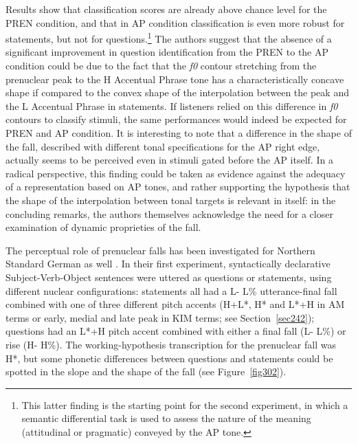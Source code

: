 Results show that classification scores are already above chance level for the PREN condition, and that in AP condition classification is even more robust for statements, but not for questions.\footnote{This latter finding is the starting point for the second experiment, in which a semantic differential task is used to assess the nature of the meaning (attitudinal or pragmatic) conveyed by the AP tone.} The authors suggest that the absence of a significant improvement in question identification from the PREN to the AP condition could be due to the fact that the \textit{f0} contour stretching from the prenuclear peak to the H Accentual Phrase tone has a characteristically concave shape if compared to the convex shape of the interpolation between the peak and the L Accentual Phrase in statements. If listeners relied on this difference in \textit{f0} contours to classify stimuli, the same performances would indeed be expected for PREN and AP condition. It is interesting to note that a difference in the shape of the fall, described with different tonal specifications for the AP right edge, actually seems to be perceived even in stimuli gated before the AP itself. In a radical perspective, this finding could be taken as evidence against the adequacy of a representation based on AP tones, and rather supporting the hypothesis that the shape of the interpolation between tonal targets is relevant in itself: in the concluding remarks, the authors themselves acknowledge the need for a closer examination of dynamic proprieties of the fall.

The perceptual role of prenuclear falls has been investigated for Northern Standard German as well \citep{petrone2014intonation}. In their first experiment, syntactically declarative Subject-Verb-Object sentences were uttered as questions or statements, using different nuclear configurations: statements all had a L- L\% utterance-final fall combined with one of three different pitch accents (H+L*, H* and L*+H in AM terms or early, medial and late peak in KIM terms; see Section~\ref{sec242}); questions had an L*+H pitch accent combined with either a final fall (L- L\%) or rise (H- H\%). The working-hypothesis transcription for the prenuclear fall was H*, but some phonetic differences between questions and statements could be spotted in the slope and the shape of the fall (see Figure~\ref{fig302}).

